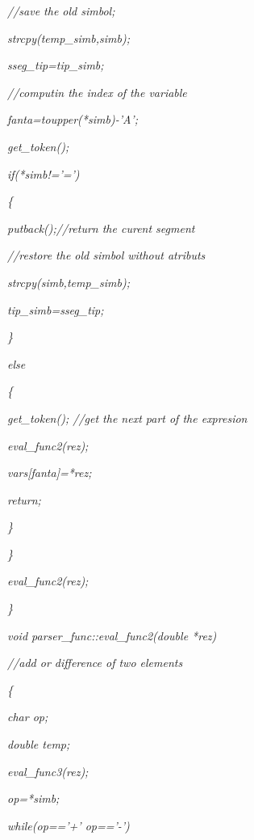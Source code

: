 \documentclass[a4paper,twoside]{book}
\begin{document}
\textit{\qquad \qquad //save the old simbol;}

\textit{\qquad \qquad strcpy(temp\_simb,simb);}

\textit{\qquad \qquad sseg\_tip=tip\_simb;}

\textit{\qquad \qquad //computin the index of the variable}

\textit{\qquad \qquad fanta=toupper(*simb)-'A';}

\textit{\qquad \qquad get\_token();}

\textit{\qquad \qquad if(*simb!='=')}

\textit{\qquad \qquad \{}

\textit{\qquad \qquad \qquad putback();//return the curent segment}

\textit{\qquad \qquad \qquad //restore the old simbol without atributs}

\textit{\qquad \qquad \qquad strcpy(simb,temp\_simb);}

\textit{\qquad \qquad \qquad tip\_simb=sseg\_tip;}

\textit{\qquad \qquad \}}

\textit{\qquad \qquad else}

\textit{\qquad \qquad \{}

\textit{\qquad \qquad \qquad get\_token(); //get the next part of the
expresion}

\textit{\qquad \qquad \qquad eval\_func2(rez);}

\textit{\qquad \qquad \qquad vars[fanta]=*rez;}

\textit{\qquad \qquad \qquad return;}

\textit{\qquad \qquad \}}

\textit{\qquad \}}

\textit{\qquad eval\_func2(rez);}

\textit{\}}

\textit{void parser\_func::eval\_func2(double *rez)}

\textit{//add or difference of two elements}

\textit{\{}

\textit{\qquad char op;}

\textit{\qquad double temp;}

\textit{\qquad }

\textit{\qquad eval\_func3(rez);}

\textit{\qquad op=*simb;}

\textit{\qquad while(op=='+' \TEXTsymbol{\vert}\TEXTsymbol{\vert} op=='-')}
\end{document}
